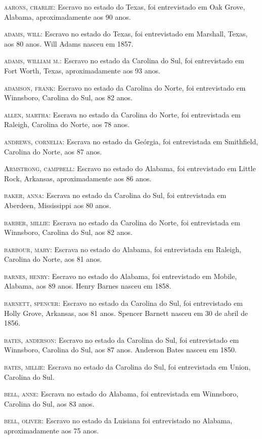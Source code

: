 \begin{Parskip}
\textsc{aarons, charlie:} Escravo no estado do Texas, foi entrevistado
em Oak Grove, Alabama, aproximadamente aos 90 anos.

\textsc{adams, will:} Escravo no estado do Texas, foi entrevistado em
Marshall, Texas, aos 80 anos. Will Adams nasceu em 1857.

\textsc{adams, william m.:} Escravo no estado da Carolina do Sul, foi
entrevistado em Fort Worth, Texas, aproximadamente aos 93 anos.

\textsc{adamson, frank:} Escravo no estado da Carolina do Norte, foi
entrevistado em Winnsboro, Carolina do Sul, aos 82 anos.

\textsc{allen, martha:} Escrava no estado da Carolina do Norte, foi
entrevistada em Raleigh, Carolina do Norte, aos 78 anos.

\textsc{andrews, cornelia:} Escrava no estado da Geórgia, foi
entrevistada em Smithfield, Carolina do Norte, aos 87 anos.

\textsc{Armstrong, campbell:} Escravo no estado do Alabama, foi
entrevistado em Little Rock, Arkansas, aproximadamente aos 86 anos.

\textsc{baker, anna:} Escrava no estado da Carolina do Sul, foi
entrevistada em Aberdeen, Mississippi aos 80 anos.

\textsc{barber, millie:} Escrava no estado da Carolina do Norte, foi
entrevistada em Winnsboro, Carolina do Sul, aos 82 anos.

\textsc{barbour, mary:} Escrava no estado do Alabama, foi entrevistada
em Raleigh, Carolina do Norte, aos 81 anos.

\textsc{barnes, henry:} Escravo no estado do Alabama, foi entrevistado
em Mobile, Alabama, aos 89 anos. Henry Barnes nasceu em 1858.

\textsc{barnett, spencer:} Escravo no estado da Carolina do Sul, foi
entrevistado em Holly Grove, Arkansas, aos 81 anos. Spencer Barnett
nasceu em 30 de abril de 1856.

\textsc{bates, anderson:} Escravo no estado da Carolina do Sul, foi
entrevistado em Winnsboro, Carolina do Sul, aos 87 anos. Anderson Bates
nasceu em 1850.

\textsc{bates, millie:} Escrava no estado da Carolina do Sul, foi
entrevistada em Union, Carolina do Sul.

\textsc{bell, anne:} Escrava no estado do Alabama, foi entrevistada em
Winnsboro, Carolina do Sul, aos 83 anos.

\textsc{bell, oliver:} Escravo no estado da Luisiana foi entrevistado no
Alabama, aproximadamente aos 75 anos.


\end{Parskip}
